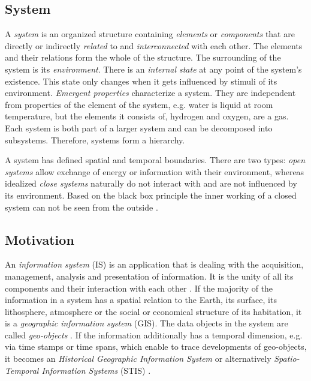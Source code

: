 
\subsection{System} %
\label{sub:system}

A \emph{system} is an organized structure containing \emph{elements} or \emph{components} that are directly or indirectly \emph{related} to and \emph{interconnected} with each other. The elements and their relations form the whole of the structure. The surrounding of the system is its \emph{environment}. There is an \emph{internal state} at any point of the system's existence. This state only changes when it gets influenced by stimuli of its environment. \emph{Emergent properties} characterize a system. They are independent from properties of the element of the system, e.g. water is liquid at room temperature, but the elements it consists of, hydrogen and oxygen, are a gas. Each system is both part of a larger system and can be decomposed into subsystems. Therefore, systems form a hierarchy.

A system has defined spatial and temporal boundaries. There are two types: \emph{open systems} allow exchange of energy or information with their environment, whereas idealized \emph{close systems} naturally do not interact with and are not influenced by its environment. Based on the black box principle the inner working of a closed system can not be seen from the outside
\cite{system}.


\subsection{Motivation} %
\label{sub:motivation}

An \emph{information system} (IS) is an application that is dealing with the acquisition, management, analysis and presentation of information. It is the unity of all its components and their interaction with each other
\cite{informationSystem}.
If the majority of the information in a system has a spatial relation to the Earth, its surface, its lithosphere, atmosphere or the social or economical structure of its habitation, it is a \emph{geographic information system} (GIS). The data objects in the system are called \emph{geo-objects}
\cite{bolstad2008gis}.
If the information additionally has a temporal dimension, e.g. via time stamps or time spans, which enable to trace developments of geo-objects, it becomes an \emph{Historical Geographic Information System}
\cite{gregory2014toward}
or alternatively \emph{Spatio-Temporal Information Systems} (STIS)
\cite{pelekis04stdms}.

